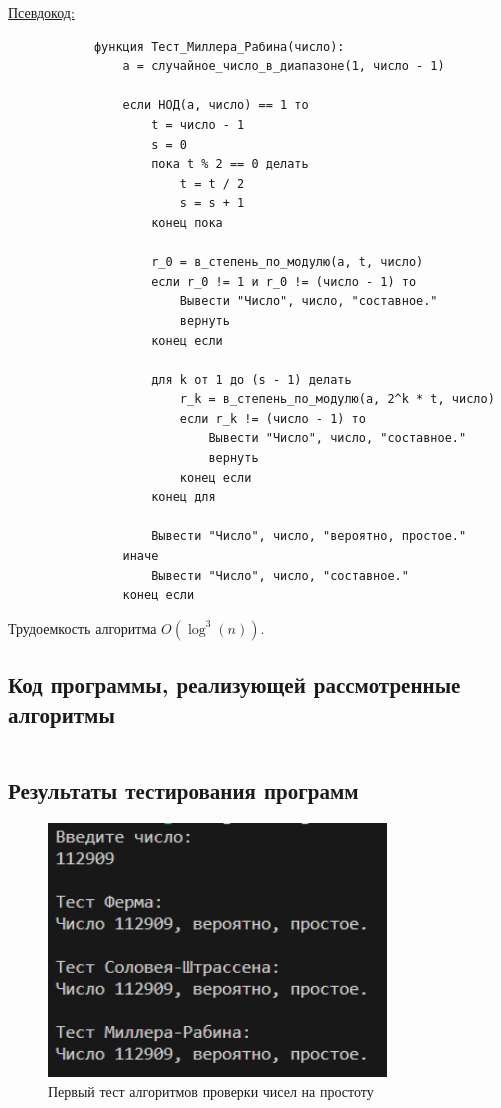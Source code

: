\documentclass[bachelor, och, labwork]{shiza}
\begin{document}
        \underline{Псевдокод:}
            \begin{verbatim}
            функция Тест_Миллера_Рабина(число):
                a = случайное_число_в_диапазоне(1, число - 1)

                если НОД(a, число) == 1 то
                    t = число - 1
                    s = 0
                    пока t % 2 == 0 делать
                        t = t / 2
                        s = s + 1
                    конец пока
            
                    r_0 = в_степень_по_модулю(a, t, число)
                    если r_0 != 1 и r_0 != (число - 1) то
                        Вывести "Число", число, "составное."
                        вернуть
                    конец если
            
                    для k от 1 до (s - 1) делать
                        r_k = в_степень_по_модулю(a, 2^k * t, число)
                        если r_k != (число - 1) то
                            Вывести "Число", число, "составное."
                            вернуть
                        конец если
                    конец для
            
                    Вывести "Число", число, "вероятно, простое."
                иначе
                    Вывести "Число", число, "составное."
                конец если
            \end{verbatim}

            Трудоемкость алгоритма $O(\log^3(n))$.\\
    
    \subsection{Код программы, реализующей рассмотренные алгоритмы}

        \inputminted[breaklines,fontsize=\small,linenos]{rust}{../code/src/main.rs}

    \subsection{Результаты тестирования программ}
        \begin{figure}[H]
            \centering
            \includegraphics[width=0.8\textwidth]{pic/1.png}
            \caption{Первый тест алгоритмов проверки чисел на простоту}
        \end{figure}
\end{document}
